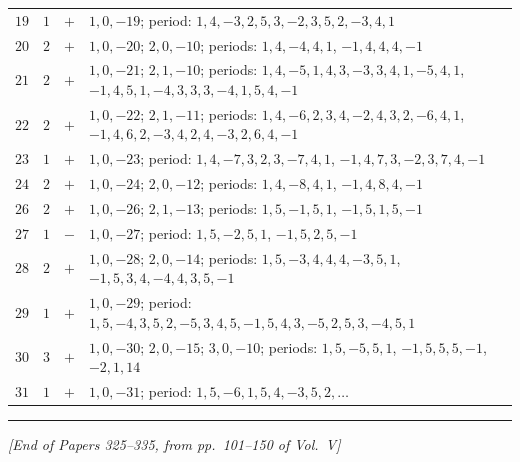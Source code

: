 \documentclass[11pt,a4paper]{article}
\begin{document}
\begin{longtable}{r|r|l|l}
$19$ & $1$ & $+$ & $1,0,-19$; period: $1,4,-3,2,5,3,-2,3,5,2,-3,4,1$ \\
$20$ & $2$ & $+$ & $1,0,-20$; $2,0,-10$; periods: $1,4,-4,4,1$, $-1,4,4,4,-1$ \\
$21$ & $2$ & $+$ & $1,0,-21$; $2,1,-10$; periods: $1,4,-5,1,4,3,-3,3,4,1,-5,4,1$, $-1,4,5,1,-4,3,3,3,-4,1,5,4,-1$ \\
$22$ & $2$ & $+$ & $1,0,-22$; $2,1,-11$; periods: $1,4,-6,2,3,4,-2,4,3,2,-6,4,1$, $-1,4,6,2,-3,4,2,4,-3,2,6,4,-1$ \\
$23$ & $1$ & $+$ & $1,0,-23$; period: $1,4,-7,3,2,3,-7,4,1$, $-1,4,7,3,-2,3,7,4,-1$ \\
$24$ & $2$ & $+$ & $1,0,-24$; $2,0,-12$; periods: $1,4,-8,4,1$, $-1,4,8,4,-1$ \\
$26$ & $2$ & $+$ & $1,0,-26$; $2,1,-13$; periods: $1,5,-1,5,1$, $-1,5,1,5,-1$ \\
$27$ & $1$ & $-$ & $1,0,-27$; period: $1,5,-2,5,1$, $-1,5,2,5,-1$ \\
$28$ & $2$ & $+$ & $1,0,-28$; $2,0,-14$; periods: $1,5,-3,4,4,4,-3,5,1$, $-1,5,3,4,-4,4,3,5,-1$ \\
$29$ & $1$ & $+$ & $1,0,-29$; period: $1,5,-4,3,5,2,-5,3,4,5,-1,5,4,3,-5,2,5,3,-4,5,1$ \\
$30$ & $3$ & $+$ & $1,0,-30$; $2,0,-15$; $3,0,-10$; periods: $1,5,-5,5,1$, $-1,5,5,5,-1$, $-2,1,14$ \\
$31$ & $1$ & $+$ & $1,0,-31$; period: $1,5,-6,1,5,4,-3,5,2,\ldots$ \\
\end{longtable}

\bigskip
\noindent\rule{\textwidth}{0.4pt}
\vspace{1em}

\begin{center}
\textit{[End of Papers 325--335, from pp.\ 101--150 of Vol.\ V]}
\end{center}
\end{document}
